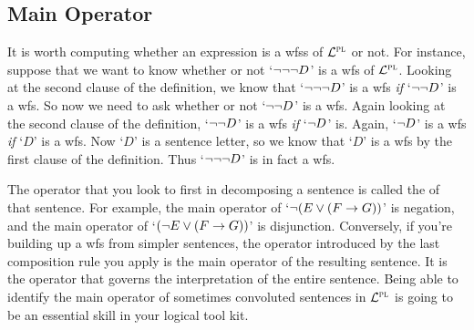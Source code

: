 \subsection{Main Operator}%
  \label{sub.main-operator}

It is worth computing whether an expression is a wfss of $\mathcal{L}^{\textsc{pl}}$ or not.
For instance, suppose that we want to know whether or not `$\neg \neg \neg D$' is a wfs of $\mathcal{L}^{\textsc{pl}}$.
Looking at the second clause of the definition, we know that `$\neg \neg \neg D$' is a wfs \emph{if} `$\neg \neg D$' is a wfs.
So now we need to ask whether or not `$\neg \neg D$' is a wfs.
Again looking at the second clause of the definition, `$\neg \neg D$' is a wfs \emph{if} `$\neg D$' is.
Again, `$\neg D$' is a wfs \emph{if} `$D$' is a wfs.
Now `$D$' is a sentence letter, so we know that `$D$' is a wfs by the first clause of the definition.
Thus `$\neg \neg \neg D$' is in fact a wfs. 

The operator that you look to first in decomposing a sentence is called the  of that sentence.
For example, the main operator of `$\neg (E \vee (F \rightarrow G))$' is negation, and the main operator of `$(\neg E \vee (F \rightarrow G))$' is disjunction.
Conversely, if you're building up a wfs from simpler sentences, the operator introduced by the last composition rule you apply is the main operator of the resulting sentence.
It is the operator that governs the interpretation of the entire sentence.
Being able to identify the main operator of sometimes convoluted sentences in $\mathcal{L}^{\textsc{pl}}$ is going to be an essential skill in your logical tool kit.



